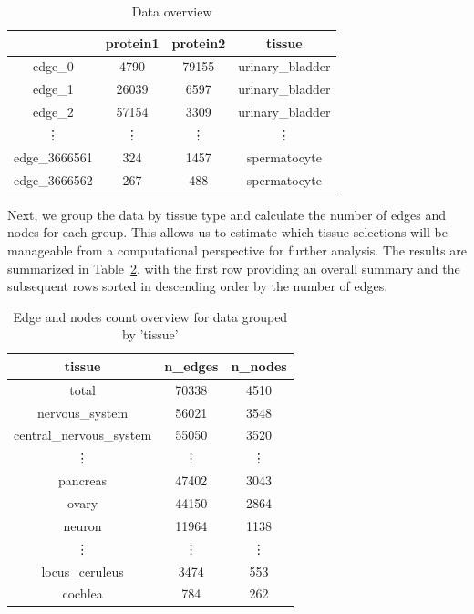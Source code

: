 \documentclass[paper=a4,fontsize=11pt,DIV=8,BCOR=5mm,oneside,pdftex,bibtotocnumbered]{scrreprt}
\theoremstyle{plain}
\begin{document}
	\begin{table}
		\caption{Data overview}
		\centering
		\begin{tabular}{|c||c|c|c|}
			\hline
			& protein1 & protein2 & tissue \\
			\hline
			edge\_0 & 4790 & 79155 & urinary\_bladder \\
			edge\_1 & 26039 & 6597 & urinary\_bladder \\
			edge\_2 & 57154 & 3309 & urinary\_bladder \\
			\vdots & \vdots & \vdots & \vdots  \\
			edge\_3666561 & 324 & 1457 & spermatocyte \\
			edge\_3666562 & 267 & 488 & spermatocyte \\
			\hline
		\end{tabular}
		
		\label{tab:head}
	\end{table}
	
	Next, we group the data by tissue type and calculate the number of edges and nodes for each group. This allows us to estimate which tissue selections will be manageable from a computational perspective for further analysis. The results are summarized in Table~\ref{tab:stats}, with the first row providing an overall summary and the subsequent rows sorted in descending order by the number of edges.
	
	\begin{table}
		\caption{Edge and nodes count overview for data grouped by 'tissue'}
		\centering
		\begin{tabular}{|c||c|c|}
			\hline
			tissue & n\_edges & n\_nodes \\
			\hline
			total & 70338 & 4510 \\
			nervous\_system & 56021 & 3548 \\
			central\_nervous\_system & 55050 & 3520 \\
			\vdots & \vdots & \vdots   \\
			pancreas & 47402 & 3043 \\
			ovary & 44150 & 2864 \\
			neuron & 11964 & 1138 \\
			\vdots & \vdots & \vdots   \\
			locus\_ceruleus & 3474 & 553 \\
			cochlea & 784 & 262 \\
			\hline
		\end{tabular}
		
		\label{tab:stats}
	\end{table}
	
\end{document}
